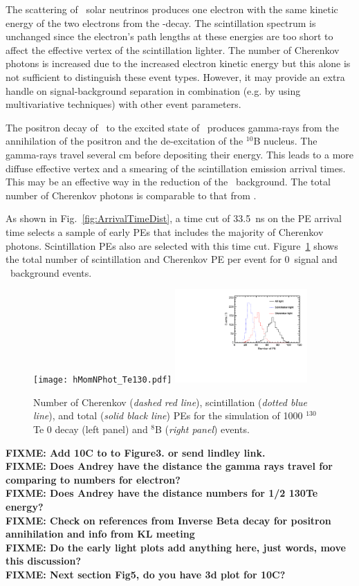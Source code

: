 The scattering of \B~solar neutrinos produces one electron with the same kinetic energy of the two electrons from the \bb-decay. The scintillation spectrum is unchanged since the electron's path lengths at these energies are too short to affect the effective vertex of the scintillation lighter. The number of Cherenkov photons is increased due to the increased electron kinetic energy but this alone is not sufficient to distinguish these event types. However, it may provide an extra handle on signal-background separation in combination (e.g. by using multivariative techniques) with other event parameters.

The positron decay of \C~to the excited state of \B~produces gamma-rays from the annihilation of the positron and the de-excitation of the $^{10}$B nucleus. The gamma-rays travel several cm before depositing their energy. This leads to a more diffuse effective vertex and a smearing of the scintillation emission arrival times. This may be an effective way in the reduction of the \C~background. The total number of Cherenkov photons is comparable to that from \nbb.

As shown in Fig.~\ref{fig:ArrivalTimeDist}, a time cut of 33.5~ns on the PE arrival time selects a sample of early PEs that includes the majority of Cherenkov photons. Scintillation PEs also are selected with this time cut. Figure~\ref{fig:NPhotDist} shows the total number of scintillation and Cherenkov PE per event for 0\nbb~signal and \B~background events. 

\begin{figure}[ht]
  \centering
  \texttt{[image: hMomNPhot\_Te130.pdf]}
  \includegraphics[width=0.45\textwidth]{hMomNPhot_1el_2p529MeV.pdf}
  \caption{Number of Cherenkov (\emph{dashed red line}), scintillation
    (\emph{dotted blue line}), and total (\emph{solid black line}) PEs
    for the simulation of 1000 $^{130}$Te 0{\nbb} decay (left panel)
    and $^8$B (\emph{right panel}) events.}
\label{fig:NPhotDist}
\end{figure}

\textbf{FIXME: Add 10C to to Figure3. or send lindley link.} \\
\textbf{FIXME: Does Andrey have the distance the gamma rays travel for comparing to numbers for electron?} \\
\textbf{FIXME: Does Andrey have the distance numbers for 1/2 130Te energy?} \\
\textbf{FIXME: Check on references from Inverse Beta decay for positron annihilation and info from KL meeting}\\
\textbf{FIXME: Do the early light plots add anything here, just words, move this discussion?}\\
\textbf{FIXME: Next section Fig5, do you have 3d plot for 10C?}
